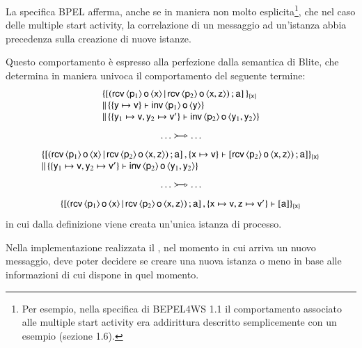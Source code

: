 La specifica BPEL afferma, anche se in maniera non molto esplicita\footnote{Per
esempio, nella specifica di BEPEL4WS 1.1 \cite{BPEL11Spec} il comportamento
associato alle multiple start activity era addirittura descritto semplicemente
con un esempio (sezione 1.6).}, che nel caso delle multiple start activity, la
correlazione di un messaggio ad un'istanza abbia precedenza sulla creazione di
nuove istanze.

Questo comportamento è espresso alla perfezione dalla semantica di Blite, che
determina in maniera univoca il comportamento del seguente termine:\\
$$
\begin{array}{l}
\{
[ ({\sf rcv}\,\langle {\sf p}_1 \rangle\, {\sf o}\, \langle {\sf x} \rangle
	 \,|\,  {\sf rcv}\,\langle {\sf p}_2 \rangle\, {\sf o}\, \langle {\sf x}, {\sf z} \rangle) 
	 \, ; {\sf a}]
\,\}_{\{{\sf x}\}}
\\ 
\|\, 
\{
\{{\sf y} \mapsto {\sf v}\} \vdash {\sf inv}\,\langle {\sf p}_1 \rangle\,{\sf o}\,\langle {\sf y} \rangle
\}
\\
\|\, 
\{
\{{\sf y}_1 \mapsto {\sf v},
{\sf y}_2 \mapsto {\sf v}'\} \vdash {\sf inv}\,\langle {\sf p}_2 \rangle\,{\sf o}\,\langle {\sf y}_1, {\sf y}_2 \rangle
\}
\end{array}
$$
$$
\begin{array}{c}
\ldots \bpelredarrow{} \ldots
\end{array}
$$
$$
\begin{array}{l}
\{
[ ({\sf rcv}\,\langle {\sf p}_1 \rangle\, {\sf o}\, \langle {\sf x} \rangle
	 \,|\,  {\sf rcv}\,\langle {\sf p}_2 \rangle\, {\sf o}\, \langle {\sf x}, {\sf z} \rangle) 
	 \, ; {\sf a}]
\, , 
\{{\sf x} \mapsto {\sf v}\} \vdash  
	[{\sf rcv}\,\langle {\sf p}_2 \rangle\, {\sf o}\, \langle {\sf x}, {\sf z} \rangle)
	\, ; {\sf a} ] 
\}_{\{{\sf x}\}}
\\
\|\, 
\{
\{{\sf y}_1 \mapsto {\sf v},
{\sf y}_2 \mapsto {\sf v}'\} \vdash {\sf inv}\,\langle {\sf p}_2 \rangle\,{\sf o}\,\langle {\sf y}_1, {\sf y}_2 \rangle
\}
\end{array}
$$
$$
\begin{array}{c}
\ldots \bpelredarrow{} \ldots
\end{array}
$$
$$
\begin{array}{l}
\{
[ ({\sf rcv}\,\langle {\sf p}_1 \rangle\, {\sf o}\, \langle {\sf x} \rangle
	 \,|\,  {\sf rcv}\,\langle {\sf p}_2 \rangle\, {\sf o}\, \langle {\sf x}, {\sf z} \rangle) 
	 \, ; {\sf a}]
\, , 
\{{\sf x} \mapsto {\sf v}, {\sf z} \mapsto {\sf v}'\} \vdash  
[{\sf a}]  
\}_{\{{\sf x}\}}
\end{array}
$$
in cui dalla definizione viene creata un'unica istanza di processo.

Nella implementazione realizzata il , nel momento in cui
arriva un nuovo messaggio, deve poter decidere se creare una nuova istanza o
meno in base alle informazioni di cui dispone in quel momento.

